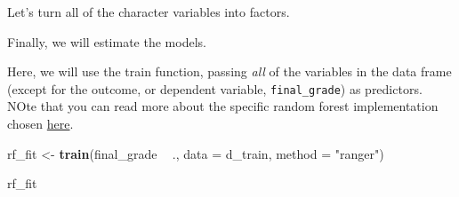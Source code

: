 \documentclass[]{book}
\newenvironment{Shaded}{\begin{snugshade}}{\end{snugshade}}
\newcommand{\KeywordTok}[1]{\textcolor[rgb]{0.13,0.29,0.53}{\textbf{#1}}}
\newcommand{\DataTypeTok}[1]{\textcolor[rgb]{0.13,0.29,0.53}{#1}}
\newcommand{\DecValTok}[1]{\textcolor[rgb]{0.00,0.00,0.81}{#1}}
\newcommand{\StringTok}[1]{\textcolor[rgb]{0.31,0.60,0.02}{#1}}
\newcommand{\CommentTok}[1]{\textcolor[rgb]{0.56,0.35,0.01}{\textit{#1}}}
\newcommand{\OtherTok}[1]{\textcolor[rgb]{0.56,0.35,0.01}{#1}}
\newcommand{\OperatorTok}[1]{\textcolor[rgb]{0.81,0.36,0.00}{\textbf{#1}}}
\newcommand{\NormalTok}[1]{#1}
\begin{document}
\begin{Shaded}
\end{Shaded}

Let's turn all of the character variables into factors.

\begin{Shaded}
\end{Shaded}

Finally, we will estimate the models.

Here, we will use the train function, passing \emph{all} of the
variables in the data frame (except for the outcome, or dependent
variable, \texttt{final\_grade}) as predictors. NOte that you can read
more about the specific random forest implementation chosen
\href{http://topepo.github.io/caret/train-models-by-tag.html\#random-forest}{here}.

\begin{Shaded}
\begin{Highlighting}[]
\NormalTok{rf_fit <-}\StringTok{ }\KeywordTok{train}\NormalTok{(final_grade }\OperatorTok{~}\StringTok{ }\NormalTok{.,}
                \DataTypeTok{data =}\NormalTok{ d_train,}
                \DataTypeTok{method =} \StringTok{"ranger"}\NormalTok{)}

\NormalTok{rf_fit}
\end{Highlighting}
\end{Shaded}
\end{document}
